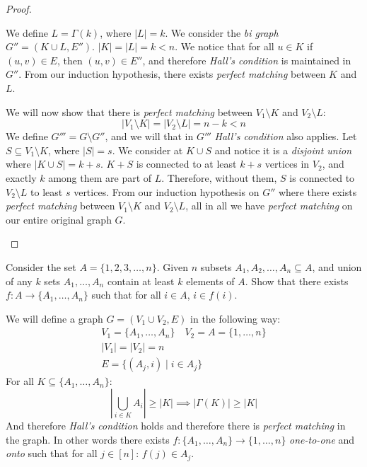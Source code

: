 \documentclass[00_complete]{subfiles}
\begin{document}
\begin{proof}
\begin{enumerate}
\begin{enumerate}[I.]
\begin{enumerate}[a.]
                        We define $L=\Gamma(k)$, where $|L|=k$. We consider
                        the \emph{bi graph} $G''=(K\cup L,E'')$. $|K|=|L|=k<n$.
                        We notice that for all $u \in K$ if $(u,v) \in E$, then
                        $(u,v) \in E''$, and therefore \emph{Hall's condition}
                        is maintained in $G''$. From our induction hypothesis,
                        there exists \emph{perfect matching} between $K$ and
                        $L$.

                        We will now show that there is \emph{perfect matching}
                        between $V_1 \setminus K$ and $V_2\setminus L$:
                        $$|V_1\setminus K| = |V_2\setminus L|=n-k<n$$
                        We define $G'''=G\setminus G''$, and we will that in
                        $G'''$ \emph{Hall's condition} also applies.
                        Let $S \subseteq V_1 \setminus K$, where $|S|=s$. We
                        consider at $K\cup S$ and notice it is a \emph{disjoint
                        union} where $|K \cup S|=k+s$. $K+S$ is connected to at
                        least $k+s$ vertices in $V_2$, and exactly $k$ among
                        them are part of $L$. Therefore, without them, $S$ is
                        connected to $V_2 \setminus L$ to least $s$ vertices.
                        From our induction hypothesis on $G''$ where there
                        exists \emph{perfect matching} between $V_1 \setminus
                        K$ and $V_2 \setminus L$, all in all we have
                        \emph{perfect matching} on our entire original graph
                        $G$.
                    \end{enumerate}
            \end{enumerate}
    \end{enumerate}
\end{proof}
\begin{example}
    Consider the set $A=\{1,2,3,\dots,n\}$. Given $n$ subsets
    $A_1,A_2,\dots,A_n \subseteq A$, and union of any $k$ sets $A_1,\dots,A_n$
    contain at least $k$ elements of $A$. Show that there exists
    $f:A\to\{A_1,\dots,A_n\}$ such that for all $i \in A$, $i \in f(i)$.

    We will define a graph $G=(V_1\cup V_2, E)$ in the following way:
    \begin{gather*}
        V_1=\{A_1,\dots,A_n\} \quad V_2=A=\{1,\dots,n\} \\
        |V_1|=|V_2|=n \\
        E=\{(A_j,i) \mid i \in A_j \}
    \end{gather*}
    For all $K \subseteq \{A_1,\dots,A_n\}$:
    $$\left|\bigcup_{i\in K}A_i\right|\geq|K|\implies |\Gamma(K)|\geq|K|$$
    And therefore \emph{Hall's condition} holds and therefore there is
    \emph{perfect matching} in the graph. In other words there exists
    $f:\{A_1,\dots,A_n\}\to\{1,\dots,n\}$ \emph{one-to-one} and \emph{onto}
    such that for all $j \in [n]$: $f(j) \in A_j$.
\end{example}
\end{document}
